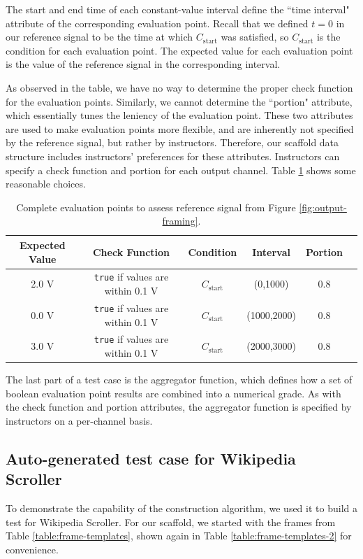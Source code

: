 \documentclass[12pt]{article}
\begin{document}
The start and end time of each constant-value interval define the ``time interval" attribute of the corresponding evaluation point.  Recall that we defined $t=0$ in our reference signal to be the time at which $C_{\text{start}}$ was satisfied, so $C_{\text{start}}$ is the condition for each evaluation point.  The expected value for each evaluation point is the value of the reference signal in the corresponding interval.

As observed in the table, we have no way to determine the proper check function for the evaluation points.  Similarly, we cannot determine the ``portion" attribute, which essentially tunes the leniency of the evaluation point.  These two attributes are used to make evaluation points more flexible, and are inherently not specified by the reference signal, but rather by instructors.  Therefore, our scaffold data structure includes instructors' preferences for these attributes.  Instructors can specify a check function and portion for each output channel.  Table \ref{table:construct-points-2} shows some reasonable choices.

\begin{table}[ht]
\begin{center}
\caption{Complete evaluation points to assess reference signal from Figure \ref{fig:output-framing}.}
\vspace{2mm}
\label{table:construct-points-2}
\begin{tabular}{cccccc}
Expected Value & Check Function & Condition & Interval & Portion \\ \hline
2.0 V & \texttt{true} if values are within 0.1 V & $C_{\text{start}}$ & (0,1000) & 0.8 \\
0.0 V & \texttt{true} if values are within 0.1 V & $C_{\text{start}}$ & (1000,2000) & 0.8 \\
3.0 V & \texttt{true} if values are within 0.1 V & $C_{\text{start}}$ & (2000,3000) & 0.8 \\ \hline
\end{tabular}
\end{center}
\end{table}

The last part of a test case is the aggregator function, which defines how a set of boolean evaluation point results are combined into a numerical grade.  As with the check function and portion attributes, the aggregator function is specified by instructors on a per-channel basis.

\subsection{Auto-generated test case for Wikipedia Scroller}
To demonstrate the capability of the construction algorithm, we used it to build a test for Wikipedia Scroller.  For our scaffold, we started with the frames from Table \ref{table:frame-templates}, shown again in Table \ref{table:frame-templates-2} for convenience.
\end{document}
